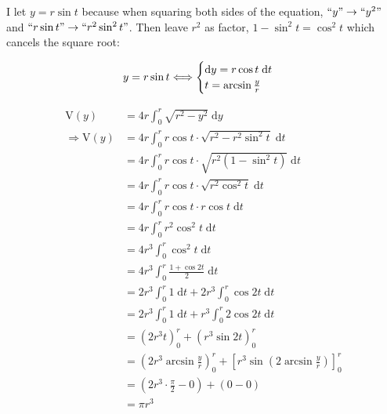 \documentclass[12pt]{article}
\begin{document}
\begin{itemize}
    I let $y=r\sin{t}$ because when squaring both sides of the equation, $``y"\to ``y^2"$ and $``r\sin{t}"\to ``r^2\sin^2{t}"$. Then leave $r^2$ as factor, $1-\sin^2{t}=\cos^2{t}$ which cancels the square root: \par
    
    \begin{equation*}
        y=r\sin{t}\\
        \Longleftrightarrow
        \begin{cases}
            \mathrm{d}y = r \cos{t}\; \mathrm{d}t\\
            t=\arcsin{\frac{y}{r}}
        \end{cases}
    \end{equation*}
    
    
    \begin{align*}
        \mathrm{V}(y) &= 4r \int_{0}^r \sqrt{r^2-y^2} \; \mathrm{d}y \\
        \Longrightarrow \mathrm{V}(y)&= 4r \int_{0}^r r\cos{t}\cdot\sqrt{r^2-r^2\sin^2{t}} \; \mathrm{d}t \\
        &= 4r \int_{0}^r r\cos{t}\cdot \sqrt{r^2 \left(1-\sin^2{t}\right)} \; \mathrm{d}t \\
        &= 4r \int_{0}^r r\cos{t}\cdot\sqrt{r^2 \cos^2{t}} \; \mathrm{d}t \\
        &= 4r \int_{0}^r r\cos{t}\cdot r \cos{t} \; \mathrm{d}t \\
        &= 4r \int_{0}^r r^2 \cos^2{t}\; \mathrm{d}t \\
        &= 4r^3 \int_{0}^r \cos^2{t}\; \mathrm{d}t \\
        &= 4r^3 \int_{0}^r \frac{1+\cos{2t}}{2}\; \mathrm{d}t \\
        &= 2r^3\int_{0}^r 1\; \mathrm{d}t +2r^3 \int_{0}^r \cos{2t}\; \mathrm{d}t \\
        &= 2r^3\int_{0}^r 1\; \mathrm{d}t
        +r^3 \int_{0}^r 2\cos{2t}\; \mathrm{d}t \\
        &= \left(2r^3 t \right)_0^r
        +\left(r^3 \sin{2t} \right)_0^r \\
        &= \left(2r^3 \arcsin{\frac{y}{r}}
        \right)_0^r
        +\left[r^3 \sin{\left( 2\arcsin{\frac{y}{r}} \right)} \right]_0^r \\
        &= \left(2r^3\cdot \frac{\pi}{2}-0 \right)
        +\left(0-0 \right) \\
        &= \pi r^3 \\
    \end{align*}
    
\end{itemize}
    
\end{document}
